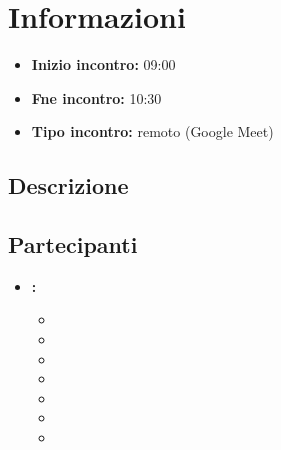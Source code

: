 \section{Informazioni}
\begin{itemize}
	\item \textbf{Inizio incontro:} 09:00
	\item \textbf{Fne incontro:} 10:30
	\item \textbf{Tipo incontro:} remoto (Google Meet)
\end{itemize}

\subsection{Descrizione}
\DocDescription

\subsection{Partecipanti}

\begin{itemize}
	\item \textbf{\GroupName:}
	\begin{itemize}
		\item \tommaso
		\item \marco
		\item \raul
		\item \sebastiano
		\item \mattia
		\item \martina
		\item \riccardo
	\end{itemize}
\end{itemize}

\clearpage

